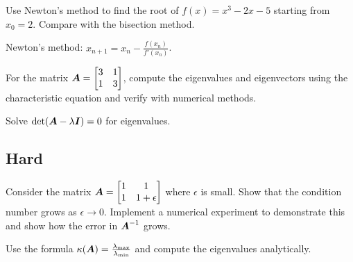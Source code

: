 \begin{exercisebox}[medium]
\begin{problem}
\label{prob:newton-method}
Use Newton's method to find the root of $f(x) = x^3 - 2x - 5$ starting from $x_0 = 2$. Compare with the bisection method.
\end{problem}
\begin{hintbox}
Newton's method: $x_{n+1} = x_n - \frac{f(x_n)}{f'(x_n)}$.
\end{hintbox}
\end{exercisebox}


\begin{exercisebox}[medium]
\begin{problem}
\label{prob:eigenvalue-computation}
For the matrix $\boldsymbol{A} = \begin{bmatrix} 3 & 1 \\ 1 & 3 \end{bmatrix}$, compute the eigenvalues and eigenvectors using the characteristic equation and verify with numerical methods.
\end{problem}
\begin{hintbox}
Solve $\det(\boldsymbol{A} - \lambda\boldsymbol{I}) = 0$ for eigenvalues.
\end{hintbox}
\end{exercisebox}


\subsection*{Hard}

\begin{exercisebox}[hard]
\begin{problem}
\label{prob:matrix-inversion-stability}
Consider the matrix $\boldsymbol{A} = \begin{bmatrix} 1 & 1 \\ 1 & 1 + \epsilon \end{bmatrix}$ where $\epsilon$ is small. Show that the condition number grows as $\epsilon \to 0$. Implement a numerical experiment to demonstrate this and show how the error in $\boldsymbol{A}^{-1}$ grows.
\end{problem}
\begin{hintbox}
Use the formula $\kappa(\boldsymbol{A}) = \frac{\lambda_{\max}}{\lambda_{\min}}$ and compute the eigenvalues analytically.
\end{hintbox}
\end{exercisebox}


